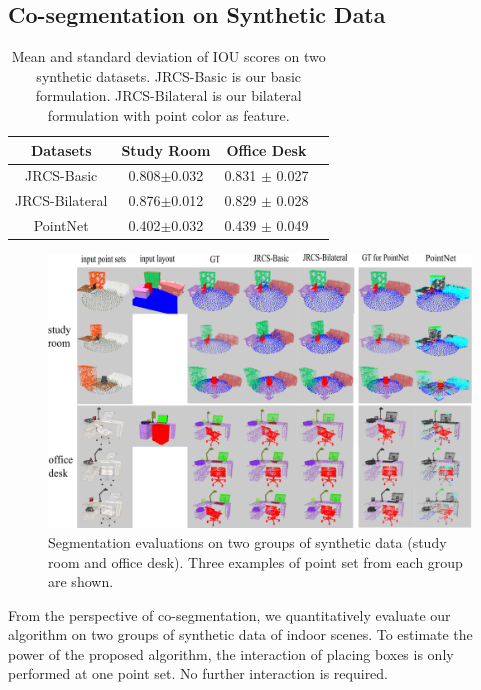 \subsection{Co-segmentation on Synthetic Data}
\begin{table}
	\centering
	\caption{Mean and standard deviation of IOU scores on two synthetic datasets. JRCS-Basic is our basic formulation. JRCS-Bilateral  is our bilateral formulation with point color as feature.}
	\begin{tabular}{c c c c}
		Datasets &  Study Room & Office Desk \\
		\hline
		JRCS-Basic & 0.808$\pm$0.032 & 0.831 $\pm$ 0.027\\   
		JRCS-Bilateral & 0.876$\pm$0.012 & 0.829 $\pm$ 0.028\\
		PointNet\cite{qi2016pointnet} & 0.402$\pm$0.032 &  0.439 $\pm$ 0.049\\
	\end{tabular}
	\label{tab:seg}
\end{table}
\begin{figure}[htb]
	\centering
	\includegraphics[width=\linewidth]{images/exp/exp_seg}
	\caption{\label{fig:seg} Segmentation evaluations on two groups of synthetic data (study room and office desk). Three examples of point set from each group are shown.}
\end{figure}
%
From the perspective of co-segmentation, we quantitatively evaluate our algorithm on two groups of synthetic data of indoor scenes. 
%
To estimate the power of the proposed algorithm, the interaction of placing boxes is only performed at one point set. No further interaction is required. 
